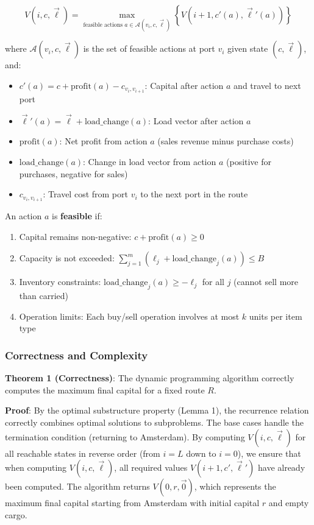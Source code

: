 \documentclass[12pt]{article}
\begin{document}
$$V(i, c, \vec{\ell}) = \max_{\text{feasible actions } a \in \mathcal{A}(v_i, c, \vec{\ell})} \left\{ V(i+1, c'(a), \vec{\ell}'(a)) \right\}$$

where $\mathcal{A}(v_i, c, \vec{\ell})$ is the set of feasible actions at port $v_i$ given state $(c, \vec{\ell})$, and:
\begin{itemize}
    \item $c'(a) = c + \text{profit}(a) - c_{v_i, v_{i+1}}$: Capital after action $a$ and travel to next port
    \item $\vec{\ell}'(a) = \vec{\ell} + \text{load\_change}(a)$: Load vector after action $a$
    \item $\text{profit}(a)$: Net profit from action $a$ (sales revenue minus purchase costs)
    \item $\text{load\_change}(a)$: Change in load vector from action $a$ (positive for purchases, negative for sales)
    \item $c_{v_i, v_{i+1}}$: Travel cost from port $v_i$ to the next port in the route
\end{itemize}

An action $a$ is \textbf{feasible} if:
\begin{enumerate}
    \item Capital remains non-negative: $c + \text{profit}(a) \geq 0$
    \item Capacity is not exceeded: $\sum_{j=1}^{m} (\ell_j + \text{load\_change}_j(a)) \leq B$
    \item Inventory constraints: $\text{load\_change}_j(a) \geq -\ell_j$ for all $j$ (cannot sell more than carried)
    \item Operation limits: Each buy/sell operation involves at most $k$ units per item type
\end{enumerate}

\subsubsection{Correctness and Complexity}

\textbf{Theorem 1 (Correctness)}: The dynamic programming algorithm correctly computes the maximum final capital for a fixed route $R$.

\textbf{Proof}: By the optimal substructure property (Lemma 1), the recurrence relation correctly combines optimal solutions to subproblems. The base cases handle the termination condition (returning to Amsterdam). By computing $V(i, c, \vec{\ell})$ for all reachable states in reverse order (from $i = L$ down to $i = 0$), we ensure that when computing $V(i, c, \vec{\ell})$, all required values $V(i+1, c', \vec{\ell}')$ have already been computed. The algorithm returns $V(0, r, \vec{0})$, which represents the maximum final capital starting from Amsterdam with initial capital $r$ and empty cargo.
\end{document}
